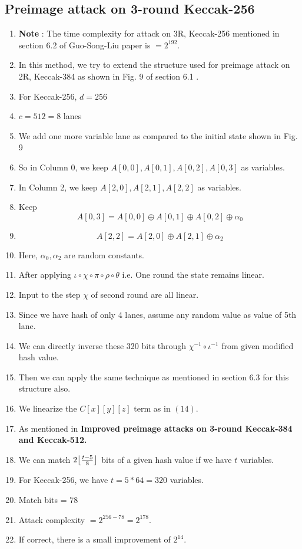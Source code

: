 \documentclass{article}
\DeclarePairedDelimiter\floor{\lfloor}{\rfloor}
\begin{document}
\subsection{Preimage attack on 3-round Keccak-256}
\begin{enumerate}
    \item \textbf{Note} : The time complexity for attack on 3R, Keccak-256 mentioned in section 6.2 of Guo-Song-Liu paper is $ = 2^{192}$.
    \item In this method, we try to extend the structure used for preimage attack on 2R, Keccak-384 as shown in Fig. 9 of section 6.1 .
    \item For Keccak-256, $d = 256$
    \item $c = 512 = 8 $ lanes
    \item We add one more variable lane as compared to the initial state shown in Fig. 9
    \item So in Column 0, we keep $A[0,0], A[0,1], A[0,2], A[0,3]$ as variables.
    \item In Column 2, we keep $A[2,0], A[2,1], A[2,2]$ as variables.
    \item Keep \[
        A[0,3] = A[0,0] \oplus A[0,1] \oplus A[0, 2] \oplus \alpha_0
    \]
    \item \[
        A[2,2] = A[2,0] \oplus A[2,1] \oplus \alpha_2
    \]
    \item Here, $\alpha_0, \alpha_2$ are random constants.
    \item After applying $\iota \circ \chi \circ \pi \circ \rho \circ \theta $ i.e. One round the state remains linear.
    \item Input to the step $\chi$ of second round are all linear.
    \item Since we have hash of only 4 lanes, assume any random value as value of 5th lane.
    \item We can directly inverse these 320 bits through $\chi^{-1} \circ \iota^{-1}$ from given modified hash value.
    \item Then we can apply the same technique as mentioned in section 6.3 for this structure also.
    \item We linearize the $C[x][y][z]$ term as in $(14)$.
    \item As mentioned in \textbf{Improved preimage attacks on 3-round Keccak-384 and Keccak-512.}
    \item We can match $2\floor*{\frac{t - 5}{8}}$ bits of a given hash value if we have $t$ variables.
    \item For Keccak-256, we have $t = 5*64 = 320$ variables.
    \item Match bits = $78$
    \item Attack complexity $ = 2^{256 - 78} = 2^{178}$.
    \item If correct, there is a small improvement of $2^{14}$.
\end{enumerate}
\end{document}
